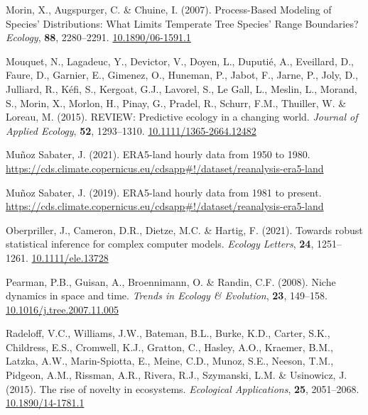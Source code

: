 \documentclass[11pt,]{article}
\newlength{\cslhangindent}
\newenvironment{CSLReferences}[2] %
 {%
  \setlength{\parindent}{0pt}
  \ifodd #1 \everypar{\setlength{\hangindent}{\cslhangindent}}\ignorespaces\fi
  \ifnum #2 > 0
  \setlength{\parskip}{#2\baselineskip}
  \fi
 }%
 {}
\begin{document}
\begin{CSLReferences}{1}{0}
\leavevmode{}%
Morin, X., Augspurger, C. \& Chuine, I. (2007). Process-{Based}
{Modeling} of {Species}' {Distributions}: {What} {Limits} {Temperate}
{Tree} {Species}' {Range} {Boundaries}? \emph{Ecology}, \textbf{88},
2280--2291. \href{https://doi.org/10.1890/06-1591.1}{10.1890/06-1591.1}

\leavevmode{}%
Mouquet, N., Lagadeuc, Y., Devictor, V., Doyen, L., Duputié, A.,
Eveillard, D., Faure, D., Garnier, E., Gimenez, O., Huneman, P., Jabot,
F., Jarne, P., Joly, D., Julliard, R., Kéfi, S., Kergoat, G.J., Lavorel,
S., Le Gall, L., Meslin, L., Morand, S., Morin, X., Morlon, H., Pinay,
G., Pradel, R., Schurr, F.M., Thuiller, W. \& Loreau, M. (2015).
{REVIEW}: {Predictive} ecology in a changing world. \emph{Journal of
Applied Ecology}, \textbf{52}, 1293--1310.
\href{https://doi.org/10.1111/1365-2664.12482}{10.1111/1365-2664.12482}

\leavevmode{}%
Muñoz Sabater, J. (2021). ERA5-land hourly data from 1950 to 1980.
\url{https://cds.climate.copernicus.eu/cdsapp\#!/dataset/reanalysis-era5-land}

\leavevmode{}%
Muñoz Sabater, J. (2019). ERA5-land hourly data from 1981 to present.
\url{https://cds.climate.copernicus.eu/cdsapp\#!/dataset/reanalysis-era5-land}

\leavevmode{}%
Oberpriller, J., Cameron, D.R., Dietze, M.C. \& Hartig, F. (2021).
Towards robust statistical inference for complex computer models.
\emph{Ecology Letters}, \textbf{24}, 1251--1261.
\href{https://doi.org/10.1111/ele.13728}{10.1111/ele.13728}

\leavevmode{}%
Pearman, P.B., Guisan, A., Broennimann, O. \& Randin, C.F. (2008). Niche
dynamics in space and time. \emph{Trends in Ecology \& Evolution},
\textbf{23}, 149--158.
\href{https://doi.org/10.1016/j.tree.2007.11.005}{10.1016/j.tree.2007.11.005}

\leavevmode{}%
Radeloff, V.C., Williams, J.W., Bateman, B.L., Burke, K.D., Carter,
S.K., Childress, E.S., Cromwell, K.J., Gratton, C., Hasley, A.O.,
Kraemer, B.M., Latzka, A.W., Marin-Spiotta, E., Meine, C.D., Munoz,
S.E., Neeson, T.M., Pidgeon, A.M., Rissman, A.R., Rivera, R.J.,
Szymanski, L.M. \& Usinowicz, J. (2015). The rise of novelty in
ecosystems. \emph{Ecological Applications}, \textbf{25}, 2051--2068.
\href{https://doi.org/10.1890/14-1781.1}{10.1890/14-1781.1}


\end{CSLReferences}
\end{document}
